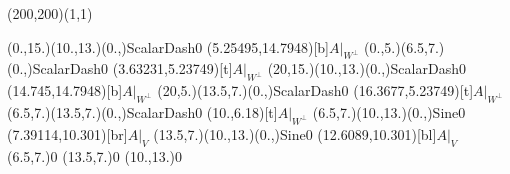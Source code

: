 \unitlength=1bp%

\begin{feynartspicture}(200,200)(1,1)

\FADiagram{}
\FAProp(0.,15.)(10.,13.)(0.,){ScalarDash}{0}
\FALabel(5.25495,14.7948)[b]{$A|_{W^\perp}$}
\FAProp(0.,5.)(6.5,7.)(0.,){ScalarDash}{0}
\FALabel(3.63231,5.23749)[t]{$A|_{W^\perp}$}
\FAProp(20,15.)(10.,13.)(0.,){ScalarDash}{0}
\FALabel(14.745,14.7948)[b]{$A|_{W^\perp}$}
\FAProp(20,5.)(13.5,7.)(0.,){ScalarDash}{0}
\FALabel(16.3677,5.23749)[t]{$A|_{W^\perp}$}
\FAProp(6.5,7.)(13.5,7.)(0.,){ScalarDash}{0}
\FALabel(10.,6.18)[t]{$A|_{W^\perp}$}
\FAProp(6.5,7.)(10.,13.)(0.,){Sine}{0}
\FALabel(7.39114,10.301)[br]{$A|_V$}
\FAProp(13.5,7.)(10.,13.)(0.,){Sine}{0}
\FALabel(12.6089,10.301)[bl]{$A|_V$}
\FAVert(6.5,7.){0}
\FAVert(13.5,7.){0}
\FAVert(10.,13.){0}
\end{feynartspicture}

